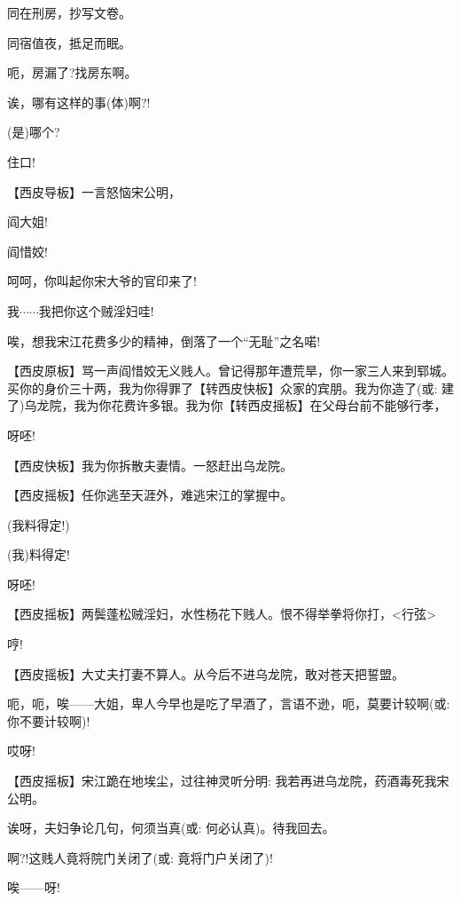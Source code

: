 {同在刑房，抄写文卷。}

{同宿值夜，抵足而眠。}

{呃，房漏了?找房东啊。}

{诶，哪有这样的事(体)啊?!}

{(是)哪个?}

{住口!}

\setlength{\hangindent}{60pt} {【{\akai 西皮导板}】一言怒恼宋公明，}

{阎大姐!}

{阎惜姣!}

{呵呵，你叫起你宋大爷的官印来了!}

{我$\cdots{}\cdots{}$我把你这个贼淫妇哇!}

{唉，想我宋江花费多少的精神，倒落了一个``无耻''之名喏!}

\setlength{\hangindent}{60pt} {【{\akai 西皮原板}】骂一声阎惜姣无义贱人。曾记得那年遭荒旱，你一家三人来到郓城。买你的身价三十两，我为你得罪了【{\footnotesize 转}{\akai 西皮快板}】众家的宾朋。我为你造了({\akai 或}: 建了)乌龙院，我为你花费许多银。我为你【{\footnotesize 转}{\akai 西皮摇板}】在父母台前不能够行孝，}

{呀呸!}

\setlength{\hangindent}{60pt} {【{\akai 西皮快板}】我为你拆散夫妻情。一怒赶出乌龙院。}

\setlength{\hangindent}{60pt} {【{\akai 西皮摇板}】任你逃至天涯外，难逃宋江的掌握中。}

{(我料得定!)}

{(我)料得定!}

{呀呸!}

\setlength{\hangindent}{60pt} {【{\akai 西皮摇板}】两鬓蓬松贼淫妇，水性杨花下贱人。恨不得举拳将你打，\textless{}行弦\textgreater{}}

{哼!}

\setlength{\hangindent}{60pt} {【{\akai 西皮摇板}】大丈夫打妻不算人。从今后不进乌龙院，敢对苍天把誓盟。}

{呃，呃，唉------大姐，卑人今早也是吃了早酒了，言语不逊，呃，莫要计较啊({\akai 或}: 你不要计较啊)!}

{哎呀!}

\setlength{\hangindent}{60pt} {【{\akai 西皮摇板}】宋江跪在地埃尘，过往神灵听分明: 我若再进乌龙院，药酒毒死我宋公明。}

{诶呀，夫妇争论几句，何须当真({\akai 或}: 何必认真)。待我回去。}

{啊?!这贱人竟将院门关闭了({\akai 或}: 竟将门户关闭了)!}

{唉------呀!}

